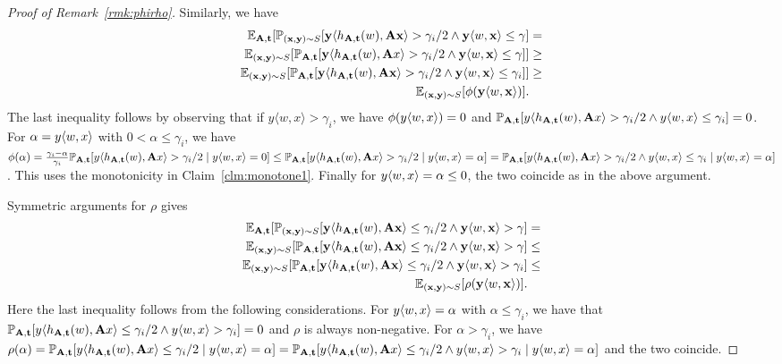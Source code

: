 \begin{proof}[Proof of Remark~\ref{rmk:phirho}]
Similarly, we have
\begin{align*}
\mathbb{E}_{\mathbf{A},\mathbf{t}} [\mathbb{P}_{(\mathbf{x},\mathbf{y}) \sim S}[\mathbf{y} \langle h_{\mathbf{A},\mathbf{t}}(w), \mathbf{A} \mathbf{x}\rangle > \gamma_i/2 \wedge \mathbf{y} \langle w, \mathbf{x}\rangle \leq \gamma] &= \\
\mathbb{E}_{(\mathbf{x},\mathbf{y}) \sim S}[\mathbb{P}_{\mathbf{A},\mathbf{t}} [\mathbf{y} \langle h_{\mathbf{A},\mathbf{t}}(w), \mathbf{A} x\rangle > \gamma_i/2 \wedge \mathbf{y} \langle w, \mathbf{x}\rangle \leq \gamma]] &\geq \\
\mathbb{E}_{(\mathbf{x},\mathbf{y}) \sim S}[\mathbb{P}_{\mathbf{A},\mathbf{t}} [\mathbf{y} \langle h_{\mathbf{A},\mathbf{t}}(w), \mathbf{A} \mathbf{x}\rangle > \gamma_i/2 \wedge \mathbf{y} \langle w, \mathbf{x}\rangle \leq \gamma_{i}]] &\geq \\
\mathbb{E}_{(\mathbf{x},\mathbf{y}) \sim S}[\phi(\mathbf{y} \langle w, \mathbf{x} \rangle)].
\end{align*}
The last inequality follows by observing that if $y \langle w, x \rangle > \gamma_i$, we have $\phi(y \langle w,x\rangle)=0$ and $\mathbb{P}_{\mathbf{A},\mathbf{t}}[y \langle h_{\mathbf{A},\mathbf{t}}(w),\mathbf{A} x\rangle > \gamma_i/2 \wedge y \langle w,x\rangle \leq \gamma_i]=0$. For $\alpha = y \langle w,x\rangle$ with $0 < \alpha \leq \gamma_i$, we have $\phi(\alpha)=\tfrac{\gamma_i-\alpha}{\gamma_i}\mathbb{P}_{\mathbf{A},\mathbf{t}}[y\langle h_{\mathbf{A},\mathbf{t}}(w),\mathbf{A} x \rangle > \gamma_i/2 \mid y \langle w,x\rangle=0] \leq \mathbb{P}_{\mathbf{A},\mathbf{t}}[y\langle h_{\mathbf{A},\mathbf{t}}(w),\mathbf{A} x \rangle > \gamma_i/2 \mid y \langle w,x\rangle=\alpha] = \mathbb{P}_{\mathbf{A},\mathbf{t}}[y\langle h_{\mathbf{A},\mathbf{t}}(w),\mathbf{A} x \rangle > \gamma_i/2 \wedge y\langle w,x\rangle\leq \gamma_i \mid y \langle w,x\rangle=\alpha]$. This uses the monotonicity in Claim~\ref{clm:monotone1}. Finally for $y\langle w,x\rangle = \alpha \leq 0$, the two coincide as in the above argument.

Symmetric arguments for $\rho$ gives
\begin{align*}
\mathbb{E}_{\mathbf{A},\mathbf{t}} [\mathbb{P}_{(\mathbf{x},\mathbf{y}) \sim S}[\mathbf{y} \langle h_{\mathbf{A},\mathbf{t}}(w), \mathbf{A} \mathbf{x}\rangle \leq \gamma_i/2 \wedge \mathbf{y} \langle w, \mathbf{x}\rangle > \gamma] &= \\
\mathbb{E}_{(\mathbf{x},\mathbf{y}) \sim S} [\mathbb{P}_{\mathbf{A},\mathbf{t}}[\mathbf{y} \langle h_{\mathbf{A},\mathbf{t}}(w), \mathbf{A} \mathbf{x}\rangle \leq \gamma_i/2 \wedge \mathbf{y} \langle w, \mathbf{x}\rangle > \gamma] &\leq \\
\mathbb{E}_{(\mathbf{x},\mathbf{y}) \sim S} [\mathbb{P}_{\mathbf{A},\mathbf{t}}[\mathbf{y} \langle h_{\mathbf{A},\mathbf{t}}(w), \mathbf{A} \mathbf{x}\rangle \leq \gamma_i/2 \wedge \mathbf{y} \langle w, \mathbf{x}\rangle > \gamma_i] &\leq \\
\mathbb{E}_{(\mathbf{x}, \mathbf{y}) \sim S}[\rho(\mathbf{y} \langle w, \mathbf{x} \rangle)].
\end{align*}
Here the last inequality follows from the following considerations. For $y \langle w,x\rangle=\alpha$ with $\alpha \leq \gamma_i$, we have that $\mathbb{P}_{\mathbf{A},\mathbf{t}}[y \langle h_{\mathbf{A},\mathbf{t}}(w), \mathbf{A} x\rangle \leq \gamma_i/2 \wedge y \langle w, x\rangle > \gamma_i] = 0$ and $\rho$ is always non-negative. For $\alpha > \gamma_i$, we have $\rho(\alpha) = \mathbb{P}_{\mathbf{A},\mathbf{t}}[y \langle h_{\mathbf{A},\mathbf{t}}(w), \mathbf{A} x\rangle \leq \gamma_i/2 \mid y \langle w, x\rangle = \alpha] = \mathbb{P}_{\mathbf{A},\mathbf{t}}[y \langle h_{\mathbf{A},\mathbf{t}}(w), \mathbf{A} x\rangle \leq \gamma_i/2 \wedge y \langle w,x\rangle > \gamma_i \mid y \langle w, x\rangle = \alpha]$ and the two coincide.


\end{proof}
